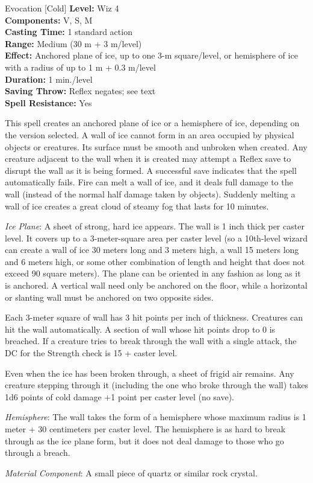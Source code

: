 {Evocation [Cold]}
{
	\textbf{Level:}
	Wiz 4\\
	\textbf{Components:}
	V, S, M\\
	\textbf{Casting Time:}
	1 standard action\\
	\textbf{Range:}
	Medium (30 m + 3 m/level)\\
	\textbf{Effect:}
	Anchored plane of ice, up to one 3-m square/level, or hemisphere of ice with a radius of up to 1 m + 0.3 m/level\\
	\textbf{Duration:}
	1 min./level\\
	\textbf{Saving Throw:}
	Reflex negates; see text\\
	\textbf{Spell Resistance:}
	Yes\\
}
{
	This spell creates an anchored plane of ice or a hemisphere of ice, depending on the version selected. A wall of ice cannot form in an area occupied by physical objects or creatures. Its surface must be smooth and unbroken when created. Any creature adjacent to the wall when it is created may attempt a Reflex save to disrupt the wall as it is being formed. A successful save indicates that the spell automatically fails. Fire can melt a wall of ice, and it deals full damage to the wall (instead of the normal half damage taken by objects). Suddenly melting a wall of ice creates a great cloud of steamy fog that lasts for 10 minutes.

	\textit{Ice Plane}:
	A sheet of strong, hard ice appears. The wall is 1 inch thick per caster level. It covers up to a 3-meter-square area per caster level (so a 10th-level wizard can create a wall of ice 30 meters long and 3 meters high, a wall 15 meters long and 6 meters high, or some other combination of length and height that does not exceed 90 square meters). The plane can be oriented in any fashion as long as it is anchored. A vertical wall need only be anchored on the floor, while a horizontal or slanting wall must be anchored on two opposite sides.

	Each 3-meter square of wall has 3 hit points per inch of thickness. Creatures can hit the wall automatically. A section of wall whose hit points drop to 0 is breached. If a creature tries to break through the wall with a single attack, the DC for the Strength check is 15 + caster level.

	Even when the ice has been broken through, a sheet of frigid air remains. Any creature stepping through it (including the one who broke through the wall) takes 1d6 points of cold damage +1 point per caster level (no save).

	\textit{Hemisphere}:
	The wall takes the form of a hemisphere whose maximum radius is 1 meter + 30 centimeters per caster level. The hemisphere is as hard to break through as the ice plane form, but it does not deal damage to those who go through a breach.

	\textit{Material Component}:
	A small piece of quartz or similar rock crystal.

}
